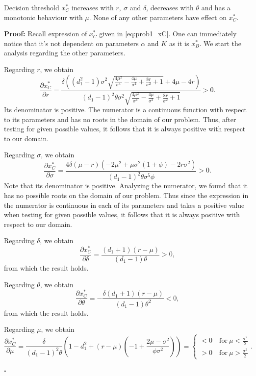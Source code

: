 \begin{prop}
	\label{1_prop2}
Decision threshold $x^*_C$ increases with $r, \ \sigma$ and $\delta$, decreases with $\theta$ and has a monotonic behaviour with  $\mu$. None of any other parameters have effect on $x^*_C$.
\end{prop}

\textbf{Proof:}
Recall expression of $x^*_C$ given in \eqref{eq:prob1_xC}. One can immediately notice that it's not dependent on parameters $\alpha$ and $K$ as it is $x^*_B$. We start the analysis regarding the other parameters. 

Regarding $r$, we obtain
$$\frac{\partial x^*_C}{\partial r}=\frac{\delta  \left(\left(d_1^2-1\right) \sigma ^2 \sqrt{\frac{4 \mu ^2}{\sigma ^4}-\frac{4 \mu }{\sigma ^2}+\frac{8 r}{\sigma ^2}+1}+4 \mu -4 r\right)}{(d_1-1)^2 \theta  \sigma ^2 \sqrt{\frac{4 \mu ^2}{\sigma ^4}-\frac{4 \mu }{\sigma ^2}+\frac{8 r}{\sigma ^2}+1}}>0.$$
Its denominator is positive. The numerator is a continuous function with respect to its parameters and has no roots in the domain of our problem. Thus, after testing for given possible values, it follows that it is always positive with respect to our domain.


Regarding $\sigma$, we obtain
$$\frac{\partial x^*_C}{\partial \sigma}=\frac{4 \delta  (\mu -r) \left(-2 \mu ^2+\mu  \sigma ^2 (1+\phi)-2 r \sigma ^2\right)}{(d_1-1)^2 \theta  \sigma ^5 \phi}>0.$$
Note that its denominator is positive.
Analyzing the numerator, we found that it has no possible roots on the domain of our problem. Thus since the expression in the numerator is continuous in each of its parameters and takes a positive value when testing for given possible values, it follows that it is always positive with respect to our domain.

Regarding $\delta$, we obtain
$$\frac{\partial x^*_C}{\partial \delta}=\frac{(d_1+1) (r-\mu )}{(d_1-1) \theta }>0,$$
from which the result holds.

Regarding $\theta$, we obtain
$$\frac{\partial x^*_C}{\partial \theta}=-\frac{\delta  (d_1+1) (r-\mu )}{(d_1-1) \theta^2}<0,$$
from which the result holds.

Regarding $\mu$, we obtain
$$\frac{\partial x^*_C}{\partial \mu}=\frac{\delta}{(d_1-1)^2 \theta} \left( 1-d_1^2 +(r-\mu)\left(-1+\frac{2\mu-\sigma^2}{\phi \sigma^2} \right) \right)= \begin{cases}
<0 \quad \text{for} \ \mu<\frac{\sigma^2}{2}\\
>0 \quad \text{for} \ \mu>\frac{\sigma^2}{2}
\end{cases}.$$
\begin{flushright}
 $\square$
\end{flushright}


